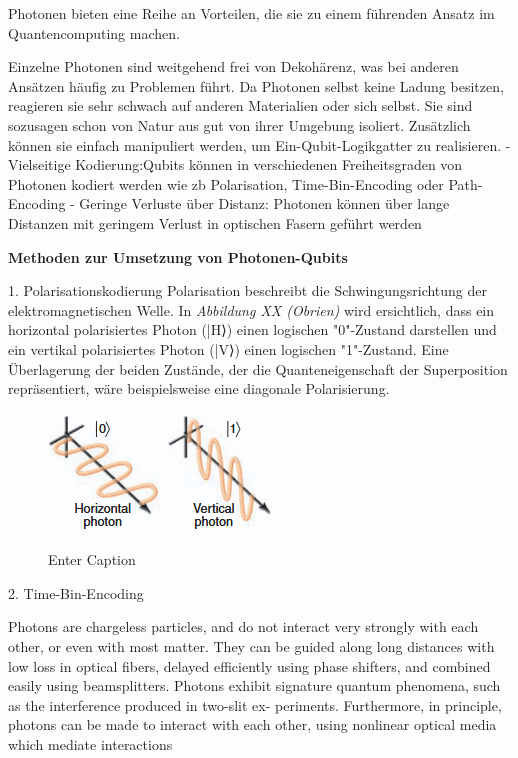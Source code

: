 Photonen bieten eine Reihe an Vorteilen, die sie zu einem führenden Ansatz im Quantencomputing machen. 

Einzelne Photonen sind weitgehend frei von Dekohärenz, was bei anderen Ansätzen häufig zu Problemen führt. Da Photonen selbst keine Ladung besitzen, reagieren sie sehr schwach auf anderen Materialien oder sich selbst. Sie sind sozusagen schon von Natur aus gut von ihrer Umgebung isoliert. 
Zusätzlich können sie einfach manipuliert werden, um Ein-Qubit-Logikgatter zu realisieren. 
- Vielseitige Kodierung:Qubits können in verschiedenen Freiheitsgraden von Photonen kodiert werden wie zb Polarisation, Time-Bin-Encoding oder Path-Encoding
- Geringe Verluste über Distanz: Photonen können über lange Distanzen mit geringem Verlust in optischen Fasern geführt werden 

\textbf{Methoden zur Umsetzung von Photonen-Qubits}

1. Polarisationskodierung
Polarisation beschreibt die Schwingungsrichtung der elektromagnetischen Welle. In\textit{ Abbildung XX (Obrien)} wird ersichtlich, dass ein horizontal polarisiertes Photon (|H⟩) einen logischen "0"-Zustand darstellen und ein vertikal polarisiertes Photon (|V⟩) einen logischen "1"-Zustand. Eine Überlagerung der beiden Zustände, der die Quanteneigenschaft der Superposition repräsentiert, wäre beispielsweise eine diagonale Polarisierung. 
\begin{figure}
    \centering
    \includegraphics[width=0.5\linewidth]{Photonen_Polarisierung.png}
    \caption{Enter Caption}
    \label{fig:enter-label}
\end{figure}
\cite{obrien_optical_2007}

2. Time-Bin-Encoding 

Photons are chargeless particles, and do not interact very strongly with each other, or even with most matter. They can be guided along long distances with low loss in optical fibers, delayed efficiently using phase shifters, and combined easily using beamsplitters. Photons exhibit signature quantum phenomena, such as the interference produced in two-slit ex- periments. Furthermore, in principle, photons can be made to interact with each other, using nonlinear optical media which mediate interactions 

